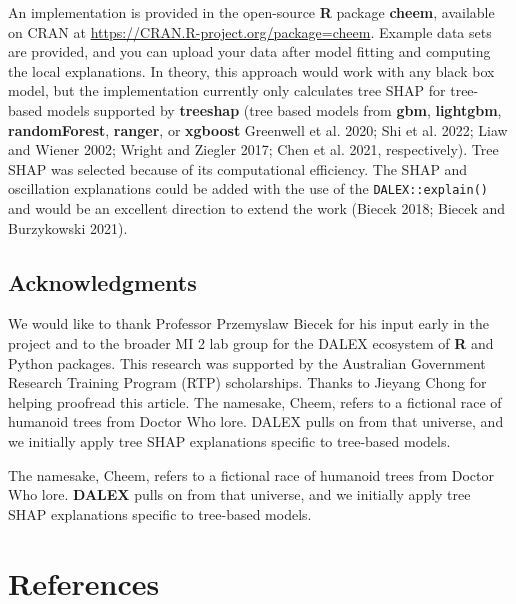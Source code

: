 \documentclass[11pt,twoside]{article}
\begin{document}
An implementation is provided in the open-source \textbf{R} package \textbf{cheem}, available on CRAN at \url{https://CRAN.R-project.org/package=cheem}. Example data sets are provided, and you can upload your data after model fitting and computing the local explanations. In theory, this approach would work with any black box model, but the implementation currently only calculates tree SHAP for tree-based models supported by \textbf{treeshap} (tree based models from \textbf{gbm}, \textbf{lightgbm}, \textbf{randomForest}, \textbf{ranger}, or \textbf{xgboost} Greenwell et al. 2020; Shi et al. 2022; Liaw and Wiener 2002; Wright and Ziegler 2017; Chen et al. 2021, respectively). Tree SHAP was selected because of its computational efficiency. The SHAP and oscillation explanations could be added with the use of the \texttt{DALEX::explain()} and would be an excellent direction to extend the work (Biecek 2018; Biecek and Burzykowski 2021).

\hypertarget{acknowledgments}{%
\subsection*{Acknowledgments}\label{acknowledgments}}

We would like to thank Professor Przemyslaw Biecek for his input early in the project and to the broader MI 2 lab group for the DALEX ecosystem of \textbf{R} and Python packages. This research was supported by the Australian Government Research Training Program (RTP) scholarships. Thanks to Jieyang Chong for helping proofread this article. The namesake, Cheem, refers to a fictional race of humanoid trees from Doctor Who lore. DALEX pulls on from that universe, and we initially apply tree SHAP explanations specific to tree-based models.

The namesake, Cheem, refers to a fictional race of humanoid trees from Doctor Who lore. \textbf{DALEX} pulls on from that universe, and we initially apply tree SHAP explanations specific to tree-based models.

\hypertarget{references}{%
\section*{References}\label{references}}
\end{document}
